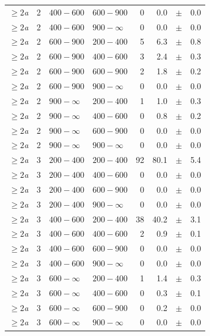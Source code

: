 \begin{table}[!t]
\begin{tabular}{rrllrrcl}
$\geq 2${\it a} & 2 & $ 400- 600$ & $600-900$ &      0 &      0.0 &$\pm$&    0.0 \\
$\geq 2${\it a} & 2 & $ 400- 600$ & $900-\infty$ &      0 &      0.0 &$\pm$&    0.0 \\
$\geq 2${\it a} & 2 & $ 600- 900$ & $200-400$ &      5 &      6.3 &$\pm$&    0.8 \\
$\geq 2${\it a} & 2 & $ 600- 900$ & $400-600$ &      3 &      2.4 &$\pm$&    0.3 \\
$\geq 2${\it a} & 2 & $ 600- 900$ & $600-900$ &      2 &      1.8 &$\pm$&    0.2 \\
$\geq 2${\it a} & 2 & $ 600- 900$ & $900-\infty$ &      0 &      0.0 &$\pm$&    0.0 \\
$\geq 2${\it a} & 2 & $ 900- \infty$ & $200-400$ &      1 &      1.0 &$\pm$&    0.3 \\
$\geq 2${\it a} & 2 & $ 900- \infty$ & $400-600$ &      0 &      0.8 &$\pm$&    0.2 \\
$\geq 2${\it a} & 2 & $ 900- \infty$ & $600-900$ &      0 &      0.0 &$\pm$&    0.0 \\
$\geq 2${\it a} & 2 & $ 900- \infty$ & $900-\infty$ &      0 &      0.0 &$\pm$&    0.0 \\
$\geq 2${\it a} & 3 & $ 200- 400$ & $200-400$ &     92 &     80.1 &$\pm$&    5.4 \\
$\geq 2${\it a} & 3 & $ 200- 400$ & $400-600$ &      0 &      0.0 &$\pm$&    0.0 \\
$\geq 2${\it a} & 3 & $ 200- 400$ & $600-900$ &      0 &      0.0 &$\pm$&    0.0 \\
$\geq 2${\it a} & 3 & $ 200- 400$ & $900-\infty$ &      0 &      0.0 &$\pm$&    0.0 \\
$\geq 2${\it a} & 3 & $ 400- 600$ & $200-400$ &     38 &     40.2 &$\pm$&    3.1 \\
$\geq 2${\it a} & 3 & $ 400- 600$ & $400-600$ &      2 &      0.9 &$\pm$&    0.1 \\
$\geq 2${\it a} & 3 & $ 400- 600$ & $600-900$ &      0 &      0.0 &$\pm$&    0.0 \\
$\geq 2${\it a} & 3 & $ 400- 600$ & $900-\infty$ &      0 &      0.0 &$\pm$&    0.0 \\
$\geq 2${\it a} & 3 & $ 600- \infty$ & $200-400$ &      1 &      1.4 &$\pm$&    0.3 \\
$\geq 2${\it a} & 3 & $ 600- \infty$ & $400-600$ &      0 &      0.3 &$\pm$&    0.1 \\
$\geq 2${\it a} & 3 & $ 600- \infty$ & $600-900$ &      0 &      0.2 &$\pm$&    0.0 \\
$\geq 2${\it a} & 3 & $ 600- \infty$ & $900-\infty$ &      0 &      0.0 &$\pm$&    0.0 \\
    \hline
  \end{tabular}
\end{table}

